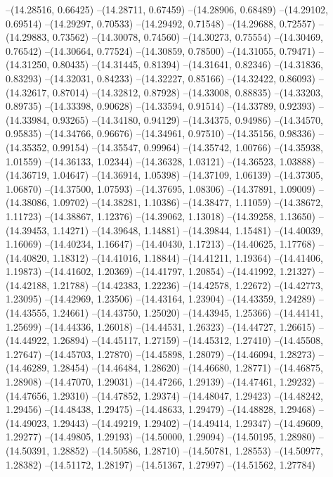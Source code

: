 --(14.28516, 0.66425)
--(14.28711, 0.67459)
--(14.28906, 0.68489)
--(14.29102, 0.69514)
--(14.29297, 0.70533)
--(14.29492, 0.71548)
--(14.29688, 0.72557)
--(14.29883, 0.73562)
--(14.30078, 0.74560)
--(14.30273, 0.75554)
--(14.30469, 0.76542)
--(14.30664, 0.77524)
--(14.30859, 0.78500)
--(14.31055, 0.79471)
--(14.31250, 0.80435)
--(14.31445, 0.81394)
--(14.31641, 0.82346)
--(14.31836, 0.83293)
--(14.32031, 0.84233)
--(14.32227, 0.85166)
--(14.32422, 0.86093)
--(14.32617, 0.87014)
--(14.32812, 0.87928)
--(14.33008, 0.88835)
--(14.33203, 0.89735)
--(14.33398, 0.90628)
--(14.33594, 0.91514)
--(14.33789, 0.92393)
--(14.33984, 0.93265)
--(14.34180, 0.94129)
--(14.34375, 0.94986)
--(14.34570, 0.95835)
--(14.34766, 0.96676)
--(14.34961, 0.97510)
--(14.35156, 0.98336)
--(14.35352, 0.99154)
--(14.35547, 0.99964)
--(14.35742, 1.00766)
--(14.35938, 1.01559)
--(14.36133, 1.02344)
--(14.36328, 1.03121)
--(14.36523, 1.03888)
--(14.36719, 1.04647)
--(14.36914, 1.05398)
--(14.37109, 1.06139)
--(14.37305, 1.06870)
--(14.37500, 1.07593)
--(14.37695, 1.08306)
--(14.37891, 1.09009)
--(14.38086, 1.09702)
--(14.38281, 1.10386)
--(14.38477, 1.11059)
--(14.38672, 1.11723)
--(14.38867, 1.12376)
--(14.39062, 1.13018)
--(14.39258, 1.13650)
--(14.39453, 1.14271)
--(14.39648, 1.14881)
--(14.39844, 1.15481)
--(14.40039, 1.16069)
--(14.40234, 1.16647)
--(14.40430, 1.17213)
--(14.40625, 1.17768)
--(14.40820, 1.18312)
--(14.41016, 1.18844)
--(14.41211, 1.19364)
--(14.41406, 1.19873)
--(14.41602, 1.20369)
--(14.41797, 1.20854)
--(14.41992, 1.21327)
--(14.42188, 1.21788)
--(14.42383, 1.22236)
--(14.42578, 1.22672)
--(14.42773, 1.23095)
--(14.42969, 1.23506)
--(14.43164, 1.23904)
--(14.43359, 1.24289)
--(14.43555, 1.24661)
--(14.43750, 1.25020)
--(14.43945, 1.25366)
--(14.44141, 1.25699)
--(14.44336, 1.26018)
--(14.44531, 1.26323)
--(14.44727, 1.26615)
--(14.44922, 1.26894)
--(14.45117, 1.27159)
--(14.45312, 1.27410)
--(14.45508, 1.27647)
--(14.45703, 1.27870)
--(14.45898, 1.28079)
--(14.46094, 1.28273)
--(14.46289, 1.28454)
--(14.46484, 1.28620)
--(14.46680, 1.28771)
--(14.46875, 1.28908)
--(14.47070, 1.29031)
--(14.47266, 1.29139)
--(14.47461, 1.29232)
--(14.47656, 1.29310)
--(14.47852, 1.29374)
--(14.48047, 1.29423)
--(14.48242, 1.29456)
--(14.48438, 1.29475)
--(14.48633, 1.29479)
--(14.48828, 1.29468)
--(14.49023, 1.29443)
--(14.49219, 1.29402)
--(14.49414, 1.29347)
--(14.49609, 1.29277)
--(14.49805, 1.29193)
--(14.50000, 1.29094)
--(14.50195, 1.28980)
--(14.50391, 1.28852)
--(14.50586, 1.28710)
--(14.50781, 1.28553)
--(14.50977, 1.28382)
--(14.51172, 1.28197)
--(14.51367, 1.27997)
--(14.51562, 1.27784)
